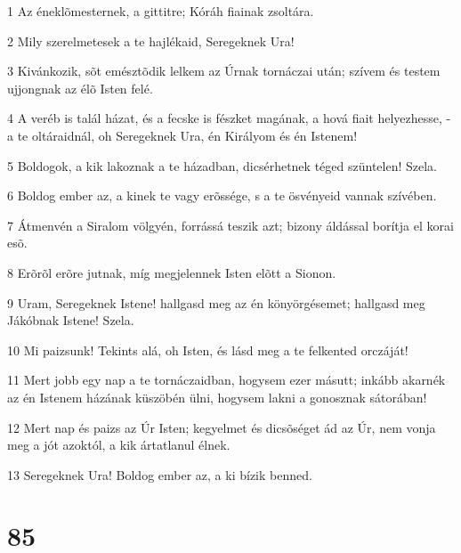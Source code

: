 \par 1 Az éneklõmesternek, a gittitre; Kóráh fiainak zsoltára.
\par 2 Mily szerelmetesek a te hajlékaid, Seregeknek Ura!
\par 3 Kivánkozik, sõt emésztõdik lelkem az Úrnak tornáczai után; szívem és testem ujjongnak az élõ Isten felé.
\par 4 A veréb is talál házat, és a fecske is fészket magának, a hová fiait helyezhesse, - a te oltáraidnál, oh Seregeknek Ura, én Királyom és én Istenem!
\par 5 Boldogok, a kik lakoznak a te házadban, dicsérhetnek téged szüntelen! Szela.
\par 6 Boldog ember az, a kinek te vagy erõssége, s a te ösvényeid vannak szívében.
\par 7 Átmenvén a Siralom völgyén, forrássá teszik azt; bizony áldással borítja el korai esõ.
\par 8 Erõrõl erõre jutnak, míg megjelennek Isten elõtt a Sionon.
\par 9 Uram, Seregeknek Istene! hallgasd meg az én könyörgésemet; hallgasd meg Jákóbnak Istene! Szela.
\par 10 Mi paizsunk! Tekints alá, oh Isten, és lásd meg a te felkented orczáját!
\par 11 Mert jobb egy nap a te tornáczaidban, hogysem ezer másutt; inkább akarnék az én Istenem házának küszöbén ülni, hogysem lakni a gonosznak sátorában!
\par 12 Mert nap és paizs az Úr Isten; kegyelmet és dicsõséget ád az Úr, nem vonja meg a jót azoktól, a kik ártatlanul élnek.
\par 13 Seregeknek Ura! Boldog ember az, a ki bízik benned.

\chapter{85}

